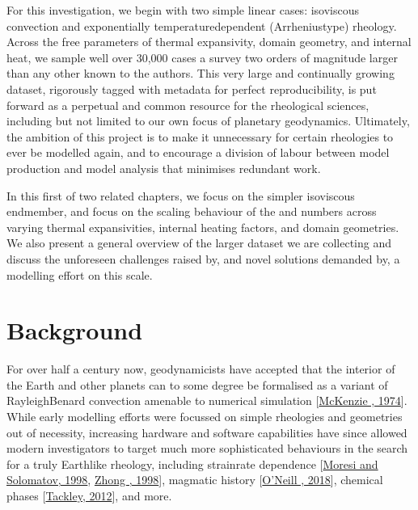 \documentclass[letterpaper,10pt,english]{jupyterBook}
\begin{document}
\sphinxAtStartPar
For this investigation, we begin with two simple linear cases: isoviscous convection and exponentially temperature\sphinxhyphen{}dependent (Arrhenius\sphinxhyphen{}type) rheology. Across the free parameters of thermal expansivity, domain geometry, and internal heat, we sample well over 30,000 cases \sphinxhyphen{} a survey two orders of magnitude larger than any other known to the authors. This very large and continually growing dataset, rigorously tagged with metadata for perfect reproducibility, is put forward as a perpetual and common resource for the rheological sciences, including but not limited to our own focus of planetary geodynamics. Ultimately, the ambition of this project is to make it unnecessary for certain rheologies to ever be modelled again, and to encourage a division of labour between model production and model analysis that minimises redundant work.

\sphinxAtStartPar
In this first of two related chapters, we focus on the simpler isoviscous endmember, and focus on the scaling behaviour of the  and  numbers across varying thermal expansivities, internal heating factors, and domain geometries. We also present a general overview of the larger dataset we are collecting and discuss the unforeseen challenges raised by, and novel solutions demanded by, a modelling effort on this scale.


\section{Background}
\label{\detokenize{content/chapter_04_isoviscous/background/intro:background}}\label{\detokenize{content/chapter_04_isoviscous/background/intro::doc}}
\sphinxAtStartPar
For over half a century now, geodynamicists have accepted that the interior of the Earth and other planets can to some degree be formalised as a variant of Rayleigh\sphinxhyphen{}Benard convection amenable to numerical simulation {[}\hyperlink{cite.references:id487}{McKenzie , 1974}{]}. While early modelling efforts were focussed on simple rheologies and geometries out of necessity, increasing hardware and software capabilities have since allowed modern investigators to target much more sophisticated behaviours in the search for a truly Earth\sphinxhyphen{}like rheology, including strain\sphinxhyphen{}rate dependence {[}\hyperlink{cite.references:id401}{Moresi and Solomatov, 1998}, \hyperlink{cite.references:id380}{Zhong , 1998}{]}, magmatic history {[}\hyperlink{cite.references:id421}{O'Neill , 2018}{]}, chemical phases {[}\hyperlink{cite.references:id276}{Tackley, 2012}{]}, and more.
\end{document}
